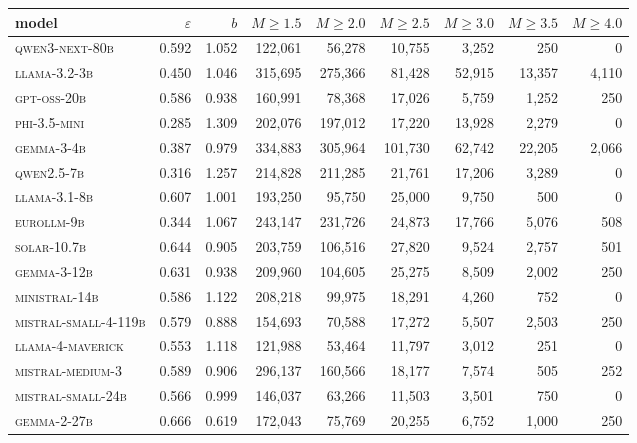 \documentclass{article}
\newcommand{\sdi}{\ensuremath{b}}
\begin{document}
\begin{table}[h]
\centering
\scriptsize
\setlength{\tabcolsep}{4pt}
\begin{tabular}{l r r r r r r r r}
\toprule
model & $\varepsilon$ & $\sdi$ & $M{\geq}1.5$ & $M{\geq}2.0$ & $M{\geq}2.5$ & $M{\geq}3.0$ & $M{\geq}3.5$ & $M{\geq}4.0$ \\
\midrule
\textsc{qwen3-next-80b}       & 0.592 & 1.052 & 122{,}061 & 56{,}278 & 10{,}755 & 3{,}252 & 250 & 0 \\
\textsc{llama-3.2-3b}         & 0.450 & 1.046 & 315{,}695 & 275{,}366 & 81{,}428 & 52{,}915 & 13{,}357 & 4{,}110 \\
\textsc{gpt-oss-20b}          & 0.586 & 0.938 & 160{,}991 & 78{,}368 & 17{,}026 & 5{,}759 & 1{,}252 & 250 \\
\textsc{phi-3.5-mini}         & 0.285 & 1.309 & 202{,}076 & 197{,}012 & 17{,}220 & 13{,}928 & 2{,}279 & 0 \\
\textsc{gemma-3-4b}           & 0.387 & 0.979 & 334{,}883 & 305{,}964 & 101{,}730 & 62{,}742 & 22{,}205 & 2{,}066 \\
\textsc{qwen2.5-7b}           & 0.316 & 1.257 & 214{,}828 & 211{,}285 & 21{,}761 & 17{,}206 & 3{,}289 & 0 \\
\textsc{llama-3.1-8b}         & 0.607 & 1.001 & 193{,}250 & 95{,}750 & 25{,}000 & 9{,}750 & 500 & 0 \\
\textsc{eurollm-9b}           & 0.344 & 1.067 & 243{,}147 & 231{,}726 & 24{,}873 & 17{,}766 & 5{,}076 & 508 \\
\textsc{solar-10.7b}          & 0.644 & 0.905 & 203{,}759 & 106{,}516 & 27{,}820 & 9{,}524 & 2{,}757 & 501 \\
\textsc{gemma-3-12b}          & 0.631 & 0.938 & 209{,}960 & 104{,}605 & 25{,}275 & 8{,}509 & 2{,}002 & 250 \\
\textsc{ministral-14b}        & 0.586 & 1.122 & 208{,}218 & 99{,}975 & 18{,}291 & 4{,}260 & 752 & 0 \\
\textsc{mistral-small-4-119b} & 0.579 & 0.888 & 154{,}693 & 70{,}588 & 17{,}272 & 5{,}507 & 2{,}503 & 250 \\
\textsc{llama-4-maverick}     & 0.553 & 1.118 & 121{,}988 & 53{,}464 & 11{,}797 & 3{,}012 & 251 & 0 \\
\textsc{mistral-medium-3}     & 0.589 & 0.906 & 296{,}137 & 160{,}566 & 18{,}177 & 7{,}574 & 505 & 252 \\
\textsc{mistral-small-24b}    & 0.566 & 0.999 & 146{,}037 & 63{,}266 & 11{,}503 & 3{,}501 & 750 & 0 \\
\textsc{gemma-2-27b}          & 0.666 & 0.619 & 172{,}043 & 75{,}769 & 20{,}255 & 6{,}752 & 1{,}000 & 250 \\

\end{tabular}
\end{table}
\end{document}
